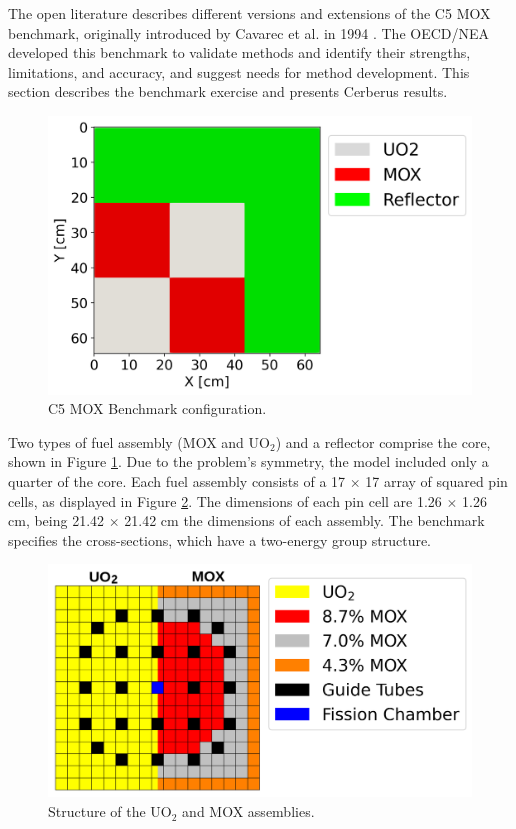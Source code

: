 \documentclass{anstrans}
\begin{document}
The open literature describes different versions and extensions of the C5 MOX benchmark, originally introduced by Cavarec et al. in 1994 \cite{cavarec_benchmark_1994}.
The \gls{OECD}/\gls{NEA} developed this benchmark to validate methods and identify their strengths, limitations, and accuracy, and suggest needs for method development.
This section describes the benchmark exercise and presents Cerberus results.

\begin{figure}[H] %
    \centering
    \includegraphics[width=0.9\linewidth]{figures/geo-xy2.png}
    \hfill
    \caption{C5 MOX Benchmark configuration.}
    \label{fig:bench1}
\end{figure}

Two types of fuel assembly (MOX and UO$_2$) and a reflector comprise the core, shown in Figure \ref{fig:bench1}.
Due to the problem's symmetry, the model included only a quarter of the core.
Each fuel assembly consists of a 17 $\times$ 17 array of squared pin cells, as displayed in Figure \ref{fig:bench2}.
The dimensions of each pin cell are 1.26 $\times$ 1.26 cm, being 21.42 $\times$ 21.42 cm the dimensions of each assembly.
The benchmark \cite{cavarec_benchmark_1994} specifies the cross-sections, which have a two-energy group structure.


\begin{figure}[htbp!] %
    \centering
    \includegraphics[width=0.9\linewidth]{figures/bench-config2B.png}
    \hfill
    \caption{Structure of the UO$_2$ and MOX assemblies.}
    \label{fig:bench2}
\end{figure}
\end{document}
